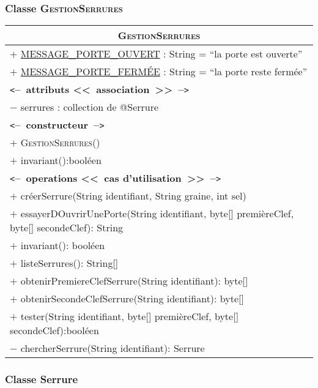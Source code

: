 \documentclass[11pt,article]{article}
\newcommand{\cmt}[1]{\texttt{<}\textbf{--~#1~--}\texttt{>}}
\newcommand{\gestionserrures}{\textsc{GestionSerrures}\xspace}
\begin{document}
\subsubsection{Classe \textsf{\gestionserrures}}

\begin{center}
\begin{longtable}{|p{15cm}|} 
\hline
\multicolumn{1}{|c|}{{\Large \textsf{\gestionserrures}}} \\
\hline
$+$ \underline{MESSAGE\_PORTE\_OUVERT} : String = ``la porte est ouverte'' \\
$+$ \underline{MESSAGE\_PORTE\_FERMÉE} : String = ``la porte reste fermée'' \\
\cmt{attributs <<~association~>>}\\
$-$ serrures : collection de @Serrure \\
\hline
\cmt{constructeur} \\
$+$ \gestionserrures()\\
$+$ invariant():booléen\\
\cmt{operations <<~cas d'utilisation~>>} \\
$+$ créerSerrure(String identifiant, String graine, int sel) \\
$+$ essayerDOuvrirUnePorte(String identifiant, byte[] premièreClef, byte[] secondeClef): String \\
$+$ invariant(): booléen \\
$+$ listeSerrures(): String[] \\
$+$ obtenirPremiereClefSerrure(String identifiant): byte[] \\
$+$ obtenirSecondeClefSerrure(String identifiant): byte[] \\
$+$ tester(String identifiant, byte[] premièreClef, byte[] secondeClef):booléen \\
$-$ chercherSerrure(String identifiant): Serrure \\
\hline  
\end{longtable}%
\end{center}

\subsubsection{Classe \textsf{Serrure}}
\end{document}
